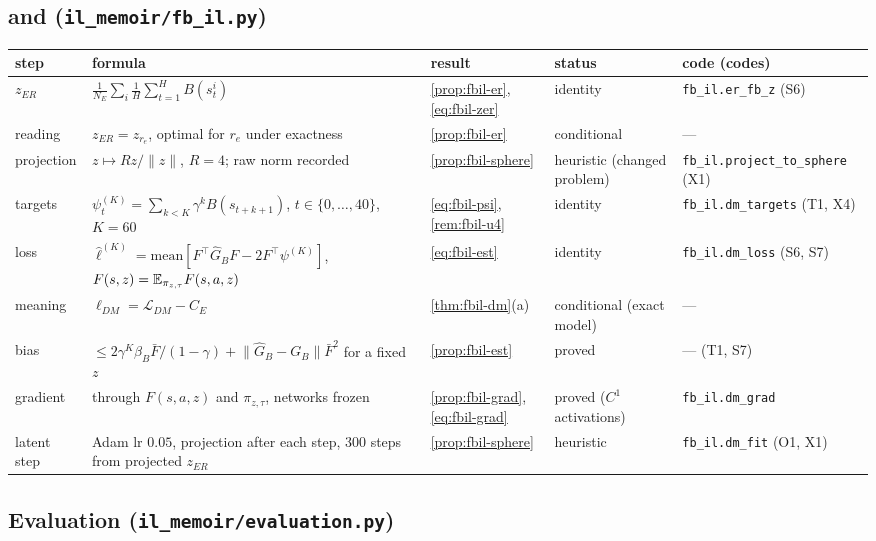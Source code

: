 \subsection{\texorpdfstring{\ERFB}{ER-FB} and \texorpdfstring{\DMFB}{DM-FB} (\texttt{il\_memoir/fb\_il.py})}

{\small
\begin{longtable}{@{}>{\raggedright\arraybackslash}p{1.8cm}>{\raggedright\arraybackslash}p{3.9cm}>{\raggedright\arraybackslash}p{2.9cm}>{\raggedright\arraybackslash}p{1.9cm}>{\raggedright\arraybackslash\footnotesize}p{3.5cm}@{}}
\toprule
step & formula & result & status & code (codes)\\
\midrule\endhead
\bottomrule\endfoot
$z_{ER}$ & $\frac1{N_E}\sum_i\frac1H\sum_{t=1}^HB(s^i_t)$ & \cref{prop:fbil-er}, \eqref{eq:fbil-zer} & identity & \nolinkurl{fb_il.er_fb_z} (S6)\\
reading & $z_{ER}=z_{r_e}$, optimal for $r_e$ under exactness & \cref{prop:fbil-er} & conditional & ---\\
projection & $z\mapsto Rz/\lVert z\rVert$, $R=4$; raw norm recorded & \cref{prop:fbil-sphere} & heuristic (changed problem) & \nolinkurl{fb_il.project_to_sphere} (X1)\\
targets & $\psi^{(K)}_t=\sum_{k<K}\gamma^kB(s_{t+k+1})$, $t\in\{0,\dots,40\}$, $K=60$ & \eqref{eq:fbil-psi}, \cref{rem:fbil-u4} & identity & \nolinkurl{fb_il.dm_targets} (T1, X4)\\
loss & $\hat\ell^{(K)}=\mathrm{mean}[F^\top\hat G_BF-2F^\top\psi^{(K)}]$, $F(s,z)=\mathbb{E}_{\pi_{z,\tau}}F(s,a,z)$ & \eqref{eq:fbil-est} & identity & \nolinkurl{fb_il.dm_loss} (S6, S7)\\
meaning & $\ell_{DM}=\mathcal L_{DM}-C_E$ & \cref{thm:fbil-dm}(a) & conditional (exact model) & ---\\
bias & $\le2\gamma^K\beta_B\bar F/(1-\gamma)+\lVert\hat G_B-G_B\rVert\bar F^2$ for a fixed $z$ & \cref{prop:fbil-est} & proved & --- (T1, S7)\\
gradient & through $F(s,a,z)$ and $\pi_{z,\tau}$, networks frozen & \cref{prop:fbil-grad}, \eqref{eq:fbil-grad} & proved ($C^1$ activations) & \nolinkurl{fb_il.dm_grad}\\
latent step & Adam lr $0.05$, projection after each step, 300 steps from projected $z_{ER}$ & \cref{prop:fbil-sphere} & heuristic & \nolinkurl{fb_il.dm_fit} (O1, X1)\\
\end{longtable}}

\subsection{Evaluation (\texttt{il\_memoir/evaluation.py})}

